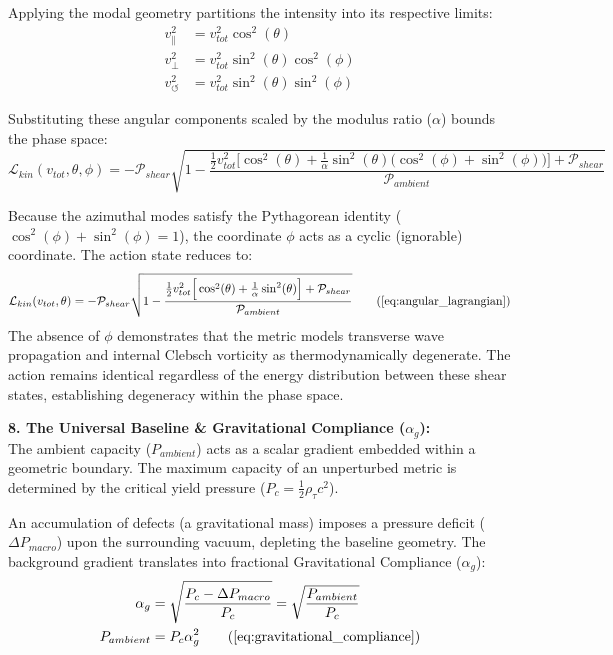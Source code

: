 Applying the modal geometry partitions the intensity into its respective limits: 
\begin{align}
    v_{\parallel}^2 &= v_{tot}^2 \cos^2(\theta) \nonumber \\
    v_{\perp}^2 &= v_{tot}^2 \sin^2(\theta)\cos^2(\phi) \nonumber \\
    v_{\circlearrowleft}^2 &= v_{tot}^2 \sin^2(\theta)\sin^2(\phi) \nonumber
\end{align}

Substituting these angular components scaled by the modulus ratio ($\alpha$) bounds the phase space:
\begin{equation}
    \mathcal{L}_{kin}(v_{tot}, \theta, \phi) = - \mathcal{P}_{shear} \sqrt{1 - \frac{\frac{1}{2} v_{tot}^2 \Big[ \cos^2(\theta) + \frac{1}{\alpha}\sin^2(\theta) \big( \cos^2(\phi) + \sin^2(\phi) \big) \Big] + \mathcal{P}_{shear}}{\mathcal{P}_{ambient}}} \nonumber
\end{equation}

Because the azimuthal modes satisfy the Pythagorean identity ($\cos^2(\phi) + \sin^2(\phi) = 1$), the coordinate $\phi$ acts as a cyclic (ignorable) coordinate. The action state reduces to: 
\begin{equation}
    \mathcal{L}_{kin}(v_{tot}, \theta) = - \mathcal{P}_{shear} \sqrt{1 - \frac{\frac{1}{2} v_{tot}^2 \Big[ \cos^2(\theta) + \frac{1}{\alpha}\sin^2(\theta) \Big] + \mathcal{P}_{shear}}{\mathcal{P}_{ambient}}} \tag{\ref{eq:angular_lagrangian}}
\end{equation}
The absence of $\phi$ demonstrates that the metric models transverse wave propagation and internal Clebsch vorticity as thermodynamically degenerate. The action remains identical regardless of the energy distribution between these shear states, establishing degeneracy within the phase space. 

\vspace{0.2 cm}

\textbf{8. The Universal Baseline \& Gravitational Compliance ($\alpha_g$):} \\
The ambient capacity ($P_{ambient}$) acts as a scalar gradient embedded within a geometric boundary. The maximum capacity of an unperturbed metric is determined by the critical yield pressure ($P_c = \frac{1}{2}\rho_\tau c^2$). 

An accumulation of defects (a gravitational mass) imposes a pressure deficit ($\Delta P_{macro}$) upon the surrounding vacuum, depleting the baseline geometry. The background gradient translates into fractional Gravitational Compliance ($\alpha_g$):
\begin{align}
    \alpha_g &= \sqrt{\frac{P_c - \Delta P_{macro}}{P_c}} = \sqrt{\frac{P_{ambient}}{P_c}} \nonumber \\
    P_{ambient} &= P_c \alpha_g^2 \tag{\ref{eq:gravitational_compliance}}
\end{align}

